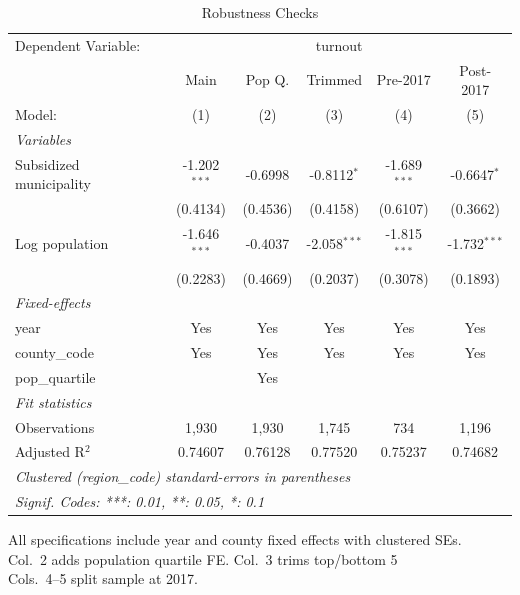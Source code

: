 
\begin{table}[htbp]
   \caption{\label{tab:robustness} Robustness Checks}
   \centering
   \begin{tabular}{lccccc}
      \tabularnewline \midrule \midrule
      Dependent Variable: & \multicolumn{5}{c}{turnout}\\
                              & Main           & Pop Q.   & Trimmed        & Pre-2017       & Post-2017 \\   
      Model:                  & (1)            & (2)      & (3)            & (4)            & (5)\\  
      \midrule
      \emph{Variables}\\
      Subsidized municipality & -1.202$^{***}$ & -0.6998  & -0.8112$^{*}$  & -1.689$^{***}$ & -0.6647$^{*}$\\   
                              & (0.4134)       & (0.4536) & (0.4158)       & (0.6107)       & (0.3662)\\   
      Log population          & -1.646$^{***}$ & -0.4037  & -2.058$^{***}$ & -1.815$^{***}$ & -1.732$^{***}$\\   
                              & (0.2283)       & (0.4669) & (0.2037)       & (0.3078)       & (0.1893)\\   
      \midrule
      \emph{Fixed-effects}\\
      year                    & Yes            & Yes      & Yes            & Yes            & Yes\\  
      county\_code            & Yes            & Yes      & Yes            & Yes            & Yes\\  
      pop\_quartile           &                & Yes      &                &                & \\  
      \midrule
      \emph{Fit statistics}\\
      Observations            & 1,930          & 1,930    & 1,745          & 734            & 1,196\\  
      Adjusted R$^2$          & 0.74607        & 0.76128  & 0.77520        & 0.75237        & 0.74682\\  
      \midrule \midrule
      \multicolumn{6}{l}{\emph{Clustered (region\_code) standard-errors in parentheses}}\\
      \multicolumn{6}{l}{\emph{Signif. Codes: ***: 0.01, **: 0.05, *: 0.1}}\\
   \end{tabular}
   
   \par \raggedright 
   All specifications include year and county fixed effects with clustered SEs.\\
   Col.~2 adds population quartile FE. Col.~3 trims top/bottom 5\\%
   Cols.~4--5 split sample at 2017.
\end{table}


